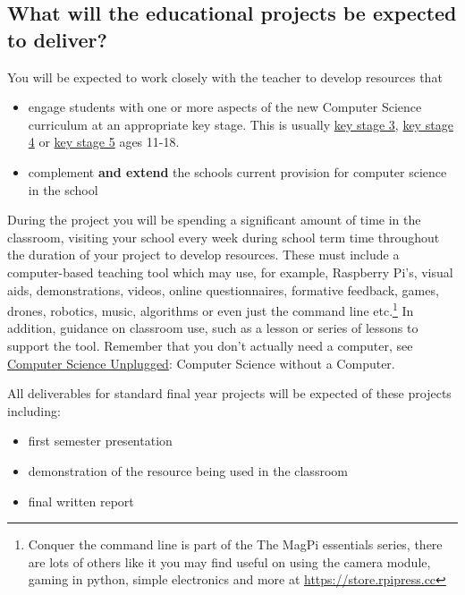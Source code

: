 \documentclass[
  12pt,
]{book}
\providecommand{\tightlist}{%
  \setlength{\itemsep}{0pt}\setlength{\parskip}{0pt}}
\begin{document}
\hypertarget{what-will-the-educational-projects-be-expected-to-deliver}{%
\subsection{What will the educational projects be expected to deliver?}\label{what-will-the-educational-projects-be-expected-to-deliver}}

You will be expected to work closely with the teacher to develop resources that

\begin{itemize}
\tightlist
\item
  engage students with one or more aspects of the new Computer Science curriculum at an appropriate key stage. This is usually \href{https://en.wikipedia.org/wiki/Key_Stage_3}{key stage 3}, \href{https://en.wikipedia.org/wiki/Key_Stage_4}{key stage 4} or \href{https://en.wikipedia.org/wiki/Key_Stage_5}{key stage 5} ages 11-18.
\item
  complement \textbf{and extend} the schools current provision for computer science in the school
\end{itemize}

During the project you will be spending a significant amount of time in the classroom, visiting your school every week during school term time throughout the duration of your project to develop resources. These must include a computer-based teaching tool which may use, for example, Raspberry Pi's, visual aids, demonstrations, videos, online questionnaires, formative feedback, games, drones, robotics, music, \citep{Aaron2016} algorithms \citep{Kubica2012} or even just the command line \citep{conquerthecommandline} etc.\footnote{Conquer the command line is part of the The MagPi essentials series, there are lots of others like it you may find useful on using the camera module, gaming in python, simple electronics and more at \url{https://store.rpipress.cc}} In addition, guidance on classroom use, such as a lesson or series of lessons to support the tool. Remember that you don't actually need a computer, see \href{https://csunplugged.org}{Computer Science Unplugged}: Computer Science without a Computer. \citep{Bell2018}

All deliverables for standard final year projects will be expected of these projects including:

\begin{itemize}
\tightlist
\item
  first semester presentation
\item
  demonstration of the resource being used in the classroom
\item
  final written report
\end{itemize}
\end{document}
